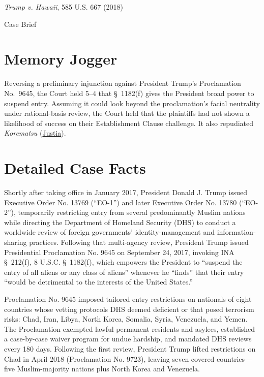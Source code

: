 \documentclass[12pt]{article}
\begin{document}
\begin{center}
{\LARGE \textit{Trump v. Hawaii}, 585 U.S. 667 (2018)\par}
\vspace{0.8em}
{\large Case Brief\par}
\end{center}
\vspace{1em}

\section{Memory Jogger}
Reversing a preliminary injunction against President Trump's Proclamation No.~9645, the Court held 5--4 that \S~1182(f) gives the President broad power to suspend entry. Assuming it could look beyond the proclamation's facial neutrality under rational-basis review, the Court held that the plaintiffs had not shown a likelihood of success on their Establishment Clause challenge. It also repudiated \textit{Korematsu} (\href{https://supreme.justia.com/cases/federal/us/585/17-965/}{Justia}).

\section{Detailed Case Facts}
Shortly after taking office in January 2017, President Donald J. Trump issued Executive Order No. 13769 (``EO-1'') and later Executive Order No. 13780 (``EO-2''), temporarily restricting entry from several predominantly Muslim nations while directing the Department of Homeland Security (DHS) to conduct a worldwide review of foreign governments' identity-management and information-sharing practices. Following that multi-agency review, President Trump issued Presidential Proclamation No. 9645 on September 24, 2017, invoking INA \S~212(f), 8 U.S.C. \S~1182(f), which empowers the President to ``suspend the entry of all aliens or any class of aliens'' whenever he ``finds'' that their entry ``would be detrimental to the interests of the United States.''

Proclamation No. 9645 imposed tailored entry restrictions on nationals of eight countries whose vetting protocols DHS deemed deficient or that posed terrorism risks: Chad, Iran, Libya, North Korea, Somalia, Syria, Venezuela, and Yemen. The Proclamation exempted lawful permanent residents and asylees, established a case-by-case waiver program for undue hardship, and mandated DHS reviews every 180 days. Following the first review, President Trump lifted restrictions on Chad in April 2018 (Proclamation No. 9723), leaving seven covered countries---five Muslim-majority nations plus North Korea and Venezuela.
\end{document}
